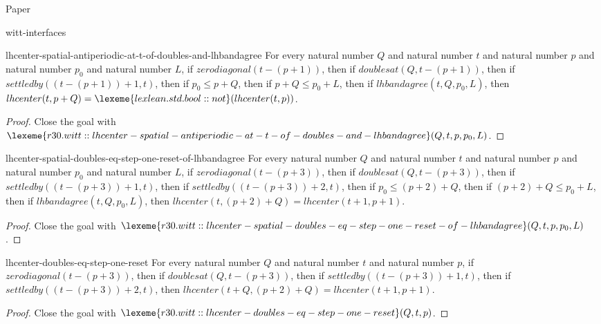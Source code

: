 \begin{lexlean}{Paper}
\begin{section}{witt-interfaces}
  \begin{theorem}{lhcenter-spatial-antiperiodic-at-t-of-doubles-and-lhbandagree}
  For every natural number \(Q\) and natural number \(t\) and natural number \(p\) and natural number \(p_0\) and natural number \(L\), if \(zerodiagonal(t - (p + 1))\), then if \(doublesat(Q, t - (p + 1))\), then if \(settledby((t - (p + 1)) + 1, t)\), then if \(p_0 ≤ p + Q\), then if \(p + Q ≤ p_0 + L\), then if \(lhbandagree(t, Q, p_0, L)\), then \(lhcenter(t, p + Q) = \lexeme{lexlean.std.bool::not}(lhcenter(t, p))\).
  \begin{proof}
  Close the goal with \(\lexeme{r30.witt::lhcenter-spatial-antiperiodic-at-t-of-doubles-and-lhbandagree}(Q, t, p, p_0, L)\).
  \end{proof}
  \end{theorem}

  \begin{theorem}{lhcenter-spatial-doubles-eq-step-one-reset-of-lhbandagree}
  For every natural number \(Q\) and natural number \(t\) and natural number \(p\) and natural number \(p_0\) and natural number \(L\), if \(zerodiagonal(t - (p + 3))\), then if \(doublesat(Q, t - (p + 3))\), then if \(settledby((t - (p + 3)) + 1, t)\), then if \(settledby((t - (p + 3)) + 2, t)\), then if \(p_0 ≤ (p + 2) + Q\), then if \((p + 2) + Q ≤ p_0 + L\), then if \(lhbandagree(t, Q, p_0, L)\), then \(lhcenter(t, (p + 2) + Q) = lhcenter(t + 1, p + 1)\).
  \begin{proof}
  Close the goal with \(\lexeme{r30.witt::lhcenter-spatial-doubles-eq-step-one-reset-of-lhbandagree}(Q, t, p, p_0, L)\).
  \end{proof}
  \end{theorem}

  \begin{theorem}{lhcenter-doubles-eq-step-one-reset}
  For every natural number \(Q\) and natural number \(t\) and natural number \(p\), if \(zerodiagonal(t - (p + 3))\), then if \(doublesat(Q, t - (p + 3))\), then if \(settledby((t - (p + 3)) + 1, t)\), then if \(settledby((t - (p + 3)) + 2, t)\), then \(lhcenter(t + Q, (p + 2) + Q) = lhcenter(t + 1, p + 1)\).
  \begin{proof}
  Close the goal with \(\lexeme{r30.witt::lhcenter-doubles-eq-step-one-reset}(Q, t, p)\).
  \end{proof}
  \end{theorem}


\end{section}
\end{lexlean}
